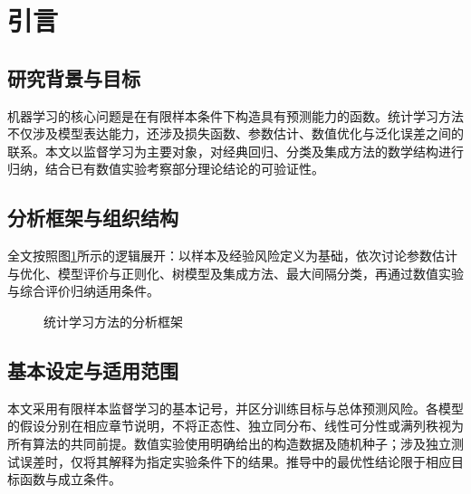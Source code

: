 \section*{引言}\label{sec:introduction}

\subsection*{研究背景与目标}
机器学习的核心问题是在有限样本条件下构造具有预测能力的函数。统计学习方法不仅涉及模型表达能力，还涉及损失函数、参数估计、数值优化与泛化误差之间的联系。本文以监督学习为主要对象，对经典回归、分类及集成方法的数学结构进行归纳，结合已有数值实验考察部分理论结论的可验证性\cite{lihang2019,zhou2016,james2023}。

\subsection*{分析框架与组织结构}
全文按照图\ref{fig:research-framework}所示的逻辑展开：以样本及经验风险定义为基础，依次讨论参数估计与优化、模型评价与正则化、树模型及集成方法、最大间隔分类，再通过数值实验与综合评价归纳适用条件。

\begin{figure}[htbp]\centering
{}
\caption{统计学习方法的分析框架}\label{fig:research-framework}
\end{figure}

\subsection*{基本设定与适用范围}
本文采用有限样本监督学习的基本记号，并区分训练目标与总体预测风险。各模型的假设分别在相应章节说明，不将正态性、独立同分布、线性可分性或满列秩视为所有算法的共同前提。数值实验使用明确给出的构造数据及随机种子；涉及独立测试误差时，仅将其解释为指定实验条件下的结果。推导中的最优性结论限于相应目标函数与成立条件。
